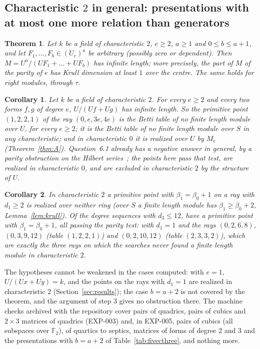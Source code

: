 \documentclass[11pt]{article}
\newtheorem{thmletter}{Theorem}
\newtheorem{corollary}{Corollary}
\theoremstyle{definition}
\theoremstyle{remark}
\newcommand{\EXP}[1]{\mbox{EXP-#1}}
\newcommand{\F}{\mathbb{F}}
\begin{document}
\subsection{Characteristic \texorpdfstring{$2$}{2} in general: presentations with at most one more relation than generators}
\label{sec:thmC}

\begin{thmletter}\label{thm:C}
Let $k$ be a field of characteristic $2$, $e\ge2$, $a\ge1$ and $0\le b\le a+1$, and let $F_1,\dots,F_b\in(U_e)^a$ be arbitrary (possibly zero or dependent). Then $M=U^a/(UF_1+\dots+UF_b)$ has infinite length; more precisely, the part of $M$ of the parity of $e$ has Krull dimension at least $1$ over the centre. The same holds for right modules, through $\tau$.
\end{thmletter}

\begin{corollary}\label{cor:C1}
Let $k$ be a field of characteristic $2$. For every $e\ge2$ and every two forms $f,g$ of degree $e$, $U/(Uf+Ug)$ has infinite length. So the primitive point $(1,2,2,1)$ of the ray $(0,e,3e,4e)$ is the Betti table of no finite length module over $U$, for every $e\ge2$; it is the Betti table of no finite length module over $S$ in any characteristic; and in characteristic $0$ it is realized over $U$ by $M_e$ (Theorem~\ref{thm:A}). Question~6.1 already has a negative answer in general, by a parity obstruction on the Hilbert series~\cite[Theorem~3.7]{JLSWXY}; the points here pass that test, are realized in characteristic $0$, and are excluded in characteristic $2$ by the structure of $U$.
\end{corollary}

\begin{corollary}\label{cor:C2}
In characteristic $2$ a primitive point with $\beta_1=\beta_0+1$ on a ray with $d_1\ge2$ is realized over neither ring (over $S$ a finite length module has $\beta_1\ge\beta_0+2$, Lemma~\ref{lem:krull}). Of the degree sequences with $d_3\le12$, \nbetaOneRays{} have a primitive point with $\beta_1=\beta_0+1$, all passing the parity test: \nbetaOneRaysDone{} with $d_1=1$ and the \nthmRays{} rays $(0,2,6,8)$, $(0,3,9,12)$ (table $(1,2,2,1)$) and $(0,2,10,12)$ (table $(2,3,3,2)$), which are exactly the three rays on which the searches never found a finite length module in characteristic $2$.
\end{corollary}

The hypotheses cannot be weakened in the cases computed: with $e=1$, $U/(Ux+Uy)=k$, and the points on the rays with $d_1=1$ are realized in characteristic $2$ (Section~\ref{sec:results}); the case $b=a+2$ is not covered by the theorem, and the argument of step 3 gives no obstruction there. The machine checks archived with the repository cover pairs of quadrics, pairs of cubics and $2\times3$ matrices of quadrics (\EXP{003}) and, in \EXP{005}, pairs of cubics (all subspaces over $\F_2$), of quartics to septics, matrices of forms of degree $2$ and $3$ and the presentations with $b=a+2$ of Table~\ref{tab:fivecthree}, and nothing more.
\end{document}
